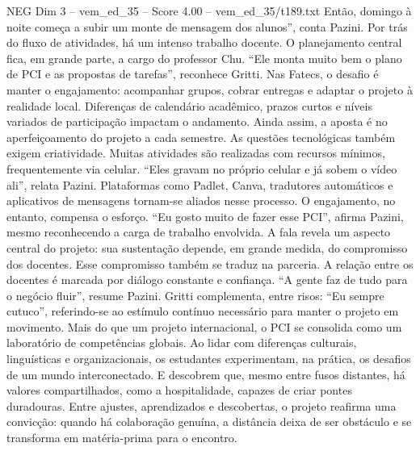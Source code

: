 \begin{textsample}{NEG Dim 3 – vem\_ed\_35 – Score 4.00 – vem\_ed\_35/t189.txt}
Então, domingo à noite começa a subir um monte de mensagem dos alunos”, conta Pazini.
Por trás do fluxo de atividades, há um intenso trabalho docente.
O planejamento central fica, em grande parte, a cargo do professor Chu. “Ele monta muito bem o plano de PCI e as propostas de tarefas”, reconhece Gritti.
Nas Fatecs, o desafio é manter o engajamento: acompanhar grupos, cobrar entregas e adaptar o projeto à realidade local.
Diferenças de calendário acadêmico, prazos curtos e níveis variados de participação impactam o andamento.
Ainda assim, a aposta é no aperfeiçoamento do projeto a cada semestre.
As questões tecnológicas também exigem criatividade.
Muitas atividades são realizadas com recursos mínimos, frequentemente via celular. “Eles gravam no próprio celular e já sobem o vídeo ali”, relata Pazini.
Plataformas como Padlet, Canva, tradutores automáticos e aplicativos de mensagens tornam-se aliados nesse processo.
O engajamento, no entanto, compensa o esforço. “Eu gosto muito de fazer esse PCI”, afirma Pazini, mesmo reconhecendo a carga de trabalho envolvida.
A fala revela um aspecto central do projeto: sua sustentação depende, em grande medida, do compromisso dos docentes.
Esse compromisso também se traduz na parceria.
A relação entre os docentes é marcada por diálogo constante e confiança. “A gente faz de tudo para o negócio fluir”, resume Pazini.
Gritti complementa, entre risos: “Eu sempre cutuco”, referindo-se ao estímulo contínuo necessário para manter o projeto em movimento.
Mais do que um projeto internacional, o PCI se consolida como um laboratório de competências globais.
Ao lidar com diferenças culturais, linguísticas e organizacionais, os estudantes experimentam, na prática, os desafios de um mundo interconectado.
E descobrem que, mesmo entre fusos distantes, há valores compartilhados, como a hospitalidade, capazes de criar pontes duradouras.
Entre ajustes, aprendizados e descobertas, o projeto reafirma uma convicção: quando há colaboração genuína, a distância deixa de ser obstáculo e se transforma em matéria-prima para o encontro.

\end{textsample}
